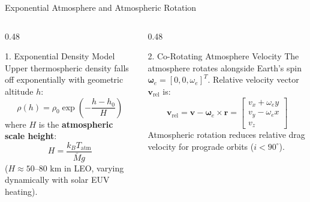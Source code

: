 \documentclass[aspectratio=169,11pt]{beamer}
\begin{document}
\begin{frame}{Exponential Atmosphere and Atmospheric Rotation}
    \begin{columns}[t]
        \begin{column}{0.48\textwidth}
            \begin{block}{1. Exponential Density Model}
                Upper thermospheric density falls off exponentially with geometric altitude $h$:
                \begin{equation*}
                    \rho(h) = \rho_0 \exp\left(-\frac{h - h_0}{H}\right)
                \end{equation*}
                where $H$ is the \textbf{atmospheric scale height}:
                \begin{equation*}
                    H = \frac{k_B T_{\text{atm}}}{\bar{M} g}
                \end{equation*}
                ($H \approx 50\text{--}80\text{ km}$ in LEO, varying dynamically with solar EUV heating).
            \end{block}
        \end{column}

        \begin{column}{0.48\textwidth}
            \begin{block}{2. Co-Rotating Atmosphere Velocity}
                The atmosphere rotates alongside Earth's spin $\boldsymbol{\omega}_e = [0, 0, \omega_e]^T$. Relative velocity vector $\mathbf{v}_{\text{rel}}$ is:
                \begin{equation*}
                    \mathbf{v}_{\text{rel}} = \mathbf{v} - \boldsymbol{\omega}_e \times \mathbf{r} = \begin{bmatrix} v_x + \omega_e y \\ v_y - \omega_e x \\ v_z \end{bmatrix}
                \end{equation*}
                Atmospheric rotation reduces relative drag velocity for prograde orbits ($i < 90^\circ$).
            \end{block}
        \end{column}
    \end{columns}
\end{frame}

\end{document}
